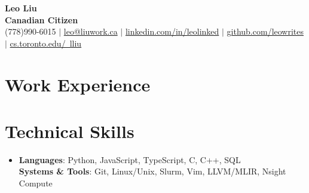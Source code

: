 \documentclass[letterpaper,11pt]{article}
\newcommand{\resumeSubHeadingListStart}{\begin{itemize}[leftmargin=0in, rightmargin=0in, label={}]}
\newcommand{\resumeSubHeadingListEnd}{\end{itemize}}
\begin{document}

\begin{center}
    {\Huge \color{blue}\textbf{Leo Liu}} \\
    \textbf{Canadian Citizen} \\
    (778)990-6015 $|$ \href{mailto:leo@liuwork.ca}{leo@liuwork.ca} $|$ 
    \href{https://linkedin.com/in/leolinked}{linkedin.com/in/leolinked} $|$
    \href{https://github.com/leowrites}{github.com/leowrites} $|$
    \href{https://www.cs.toronto.edu/~lliu}{cs.toronto.edu/~lliu}
    \vspace{-8pt}
\end{center}



\section{Work Experience}
    \resumeSubHeadingListStart
        
        
        
        
        
    \resumeSubHeadingListEnd



\section{Technical Skills}
 \begin{itemize}[leftmargin=0in, label={}]
    \item
        \textbf{Languages}: Python, JavaScript, TypeScript, C, C++, SQL \\
        \textbf{Systems \& Tools}: Git, Linux/Unix, Slurm, Vim, LLVM/MLIR, Nsight Compute \\
 \end{itemize}
 
\end{document}
